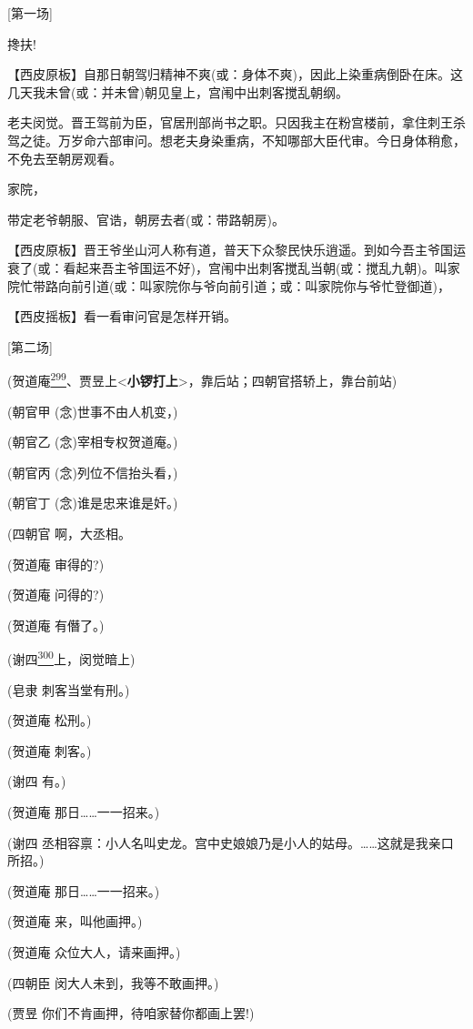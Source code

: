 {[}第一场{]}

搀扶!

【西皮原板】自那日朝驾归精神不爽(或：身体不爽)，因此上染重病倒卧在床。这几天我未曾(或：并未曾)朝见皇上，宫闱中出刺客搅乱朝纲。

老夫闵觉。晋王驾前为臣，官居刑部尚书之职。只因我主在粉宫楼前，拿住刺王杀驾之徒。万岁命六部审问。想老夫身染重病，不知哪部大臣代审。今日身体稍愈，不免去至朝房观看。

家院，

带定老爷朝服、官诰，朝房去者(或：带路朝房)。

【西皮原板】晋王爷坐山河人称有道，普天下众黎民快乐逍遥。到如今吾主爷国运衰了(或：看起来吾主爷国运不好)，宫闱中出刺客搅乱当朝(或：搅乱九朝)。叫家院忙带路向前引道(或：叫家院你与爷向前引道；或：叫家院你与爷忙登御道)，

【西皮摇板】看一看审问官是怎样开销。

{[}第二场{]}

(贺道庵\protect\hyperlink{fn299}{\textsuperscript{299}}、贾昱上\textless{}\textbf{小锣打上}\textgreater{}，靠后站；四朝官搭轿上，靠台前站)

(朝官甲 (念)世事不由人机变，)

(朝官乙 (念)宰相专权贺道庵。)

(朝官丙 (念)列位不信抬头看，)

(朝官丁 (念)谁是忠来谁是奸。)

(四朝官 啊，大丞相。

(贺道庵 审得的?)

(贺道庵 问得的?)

(贺道庵 有僭了。)

(谢四\protect\hyperlink{fn300}{\textsuperscript{300}}上，闵觉暗上)

(皂隶 刺客当堂有刑。)

(贺道庵 松刑。)

(贺道庵 刺客。)

(谢四 有。)

(贺道庵 那日\ldots{}\ldots{}一一招来。)

(谢四
丞相容禀：小人名叫史龙。宫中史娘娘乃是小人的姑母。\ldots{}\ldots{}这就是我亲口所招。)

(贺道庵 那日\ldots{}\ldots{}一一招来。)

(贺道庵 来，叫他画押。)

(贺道庵 众位大人，请来画押。)

(四朝臣 闵大人未到，我等不敢画押。)

(贾昱 你们不肯画押，待咱家替你都画上罢!)

